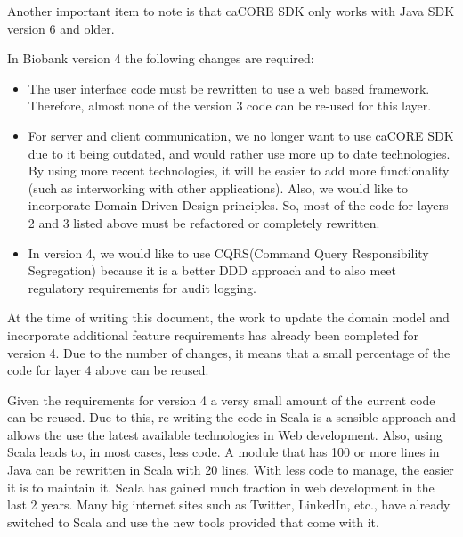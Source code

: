 Another important item to note is that caCORE SDK only works with Java SDK
version 6 and older.

In Biobank version 4 the following changes are required:

\begin{itemize}
\item The user interface code must be rewritten to use a web based
  framework. Therefore, almost none of the version 3 code can be re-used for
  this layer.
\item For server and client communication, we no longer want to use caCORE SDK
  due to it being outdated, and would rather use more up to date
  technologies. By using more recent technologies, it will be easier to add
  more functionality (such as interworking with other applications). Also, we
  would like to incorporate Domain Driven Design principles. So, most of
  the code for layers 2 and 3 listed above must be refactored or completely
  rewritten.
\item In version 4, we would like to use CQRS(Command Query Responsibility
  Segregation) because it is a better DDD approach and to also meet regulatory
  requirements for audit logging.
\end{itemize}

At the time of writing this document, the work to update the domain model and
incorporate additional feature requirements has already been completed for
version 4. Due to the number of changes, it means that a small percentage of
the code for layer 4 above can be reused.

Given the requirements for version 4 a versy small amount of the current code
can be reused.  Due to this, re-writing the code in Scala is a sensible
approach and allows the use the latest available technologies in Web
development. Also, using Scala leads to, in most cases, less code. A module
that has 100 or more lines in Java can be rewritten in Scala with 20
lines. With less code to manage, the easier it is to maintain it. Scala has
gained much traction in web development in the last 2 years. Many big internet
sites such as Twitter, LinkedIn, etc., have already switched to Scala and use
the new tools provided that come with it.


